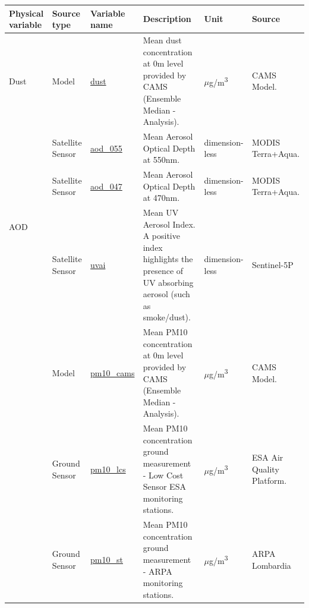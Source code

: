 \begin{center}
\setlength{\arrayrulewidth}{1.5pt}
\begin{longtable}{ |p{1.5cm}|p{1.5cm}|p{2.3cm}|p{4cm}|p{2cm}|p{2.3cm}| } 
\hline
\textbf{Physical variable} & \textbf{Source type}  & \textbf{Variable name}  & \textbf{Description}  & \textbf{Unit}  & \textbf{Source}\\ 
\hline
\multirow{1}{4em}{Dust} & Model  & \underline{dust} & Mean dust concentration at 0m level provided by CAMS (Ensemble Median - Analysis).\par & $\mu$g/m\textsuperscript{3} & CAMS Model.\\ \hline

\multirow{3}{4em}{AOD} & Satellite \newline Sensor  & \underline{aod\_055} & Mean Aerosol Optical Depth at 550nm.\par & dimension-\newline less & MODIS Terra+Aqua.\\ 
& Satellite \newline Sensor  & \underline{aod\_047} &  Mean Aerosol Optical Depth at 470nm.\par & dimension-\newline less & MODIS Terra+Aqua.\\ 
& Satellite \newline Sensor & \underline{uvai} &  Mean UV Aerosol Index. A positive index highlights the presence of UV absorbing aerosol (such as smoke/dust). \par & dimension-\newline less & Sentinel-5P\\ \hline
\pagebreak
\hline
\multirow{3}{4em}{PM10} & Model  & \underline{pm10\_cams} & Mean PM10 concentration at 0m level provided by CAMS  (Ensemble Median - Analysis).\par & $\mu$g/m\textsuperscript{3} & CAMS Model.\\ 
& Ground \newline Sensor  & \underline{pm10\_lcs} &  Mean PM10 concentration ground measurement - Low Cost Sensor ESA monitoring stations.\par & $\mu$g/m\textsuperscript{3} & ESA Air Quality Platform.\\ 
& Ground \newline Sensor & \underline{pm10\_st} &  Mean PM10 concentration ground measurement - ARPA monitoring stations. \par & $\mu$g/m\textsuperscript{3} & ARPA \newline Lombardia\\ \hline


\end{longtable}
\end{center}
